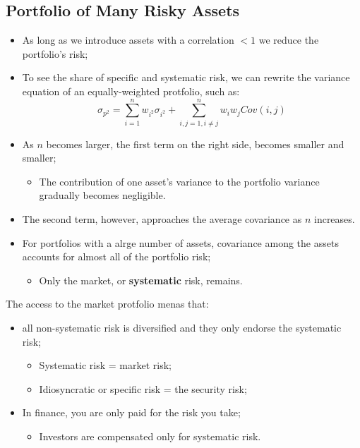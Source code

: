 \documentclass[11pt,a4paper]{report}
\begin{document}
\subsection{Portfolio of Many Risky Assets}
\begin{itemize}
    \item As long as we introduce assets with a correlation $<1$ we reduce the portfolio's risk;
    \item To see the share of specific and systematic risk, we can rewrite the variance equation of an equally-weighted protfolio, such as:
    \[\sigma_{p^2} = \sum_{i=1}^{n} w_{i^2}\sigma_{i^2} + \sum_{i, j=1, i \neq j}^{n} w_iw_jCov(i,j)\]
    \item As $n$ becomes larger, the first term on the right side, becomes smaller and smaller;
    \begin{itemize}
        \item The contribution of one asset's variance to the portfolio variance gradually becomes negligible.
    \end{itemize}
    \item The second term, however, approaches the average covariance as $n$ increases.
    \item For portfolios with a alrge number of assets, covariance among the assets accounts for almost all of the portfolio risk;
    \begin{itemize}
        \item Only the market, or \textbf{systematic} risk, remains.
    \end{itemize}
\end{itemize}
The access to the market protfolio menas that:
\begin{itemize}
    \item all non-systematic risk is diversified and they only endorse the systematic risk;
    \begin{itemize}
        \item Systematic risk = market risk;
        \item Idiosyncratic or specific risk = the security risk;
    \end{itemize}
    \item In finance, you are only paid for the risk you take;
    \begin{itemize}
        \item Investors are compensated only for systematic risk.
    \end{itemize}
\end{itemize}
\end{document}
